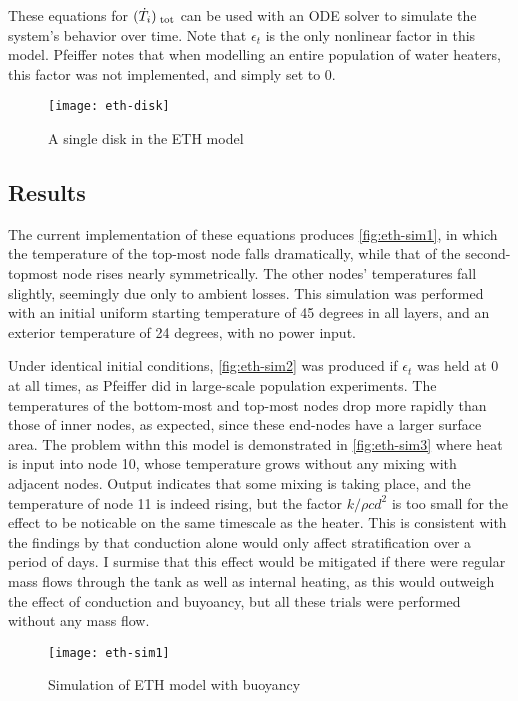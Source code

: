 \documentclass{article}
\begin{document}
These equations for $(\dot{T}_{i})_{\;\text{tot}}$ can be used with an ODE solver to simulate the system's behavior over time.
Note that $\epsilon_t$ is the only nonlinear factor in this model.
Pfeiffer notes that when modelling an entire population of water heaters, this factor was not implemented, and simply set to 0.

\begin{figure}
   \centering
   \texttt{[image: eth-disk]}
   \caption{A single disk in the ETH model}
   \label{fig:eth-disk}
\end{figure}

\subsection{Results}

The current implementation of these equations produces \autoref{fig:eth-sim1}, in which the temperature of the top-most node falls dramatically, while that of the second-topmost node rises nearly symmetrically.
The other nodes' temperatures fall slightly, seemingly due only to ambient losses.
This simulation was performed with an initial uniform starting temperature of 45 degrees in all layers, and an exterior temperature of 24 degrees, with no power input.

Under identical initial conditions, \autoref{fig:eth-sim2} was produced if $\epsilon_t$ was held at 0 at all times, as Pfeiffer did in large-scale population experiments.
The temperatures of the bottom-most and top-most nodes drop more rapidly than those of inner nodes, as expected, since these end-nodes have a larger surface area.
The problem withn this model is demonstrated in \autoref{fig:eth-sim3} where heat is input into node 10, whose temperature grows without any mixing with adjacent nodes.
Output indicates that some mixing is taking place, and the temperature of node 11 is indeed rising, but the factor $k / \rho c d^2$ is too small for the effect to be noticable on the same timescale as the heater.
This is consistent with the findings by  that conduction alone would only affect stratification over a period of days.
I surmise that this effect would be mitigated if there were regular mass flows through the tank as well as internal heating, as this would outweigh the effect of conduction and buyoancy, but all these trials were performed without any mass flow.

\begin{figure}
   \centering
   \texttt{[image: eth-sim1]}
   \caption{Simulation of ETH model with buoyancy}
   \label{fig:eth-sim1}
\end{figure}
\end{document}
